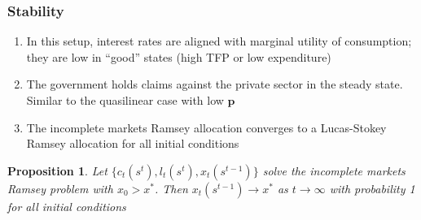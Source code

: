 \documentclass{beamer}
\newcommand{\EE}{\mathbb E}
\newtheorem{proposition}{Proposition}
\begin{document}
%
%
%
\begin{frame}
	\frametitle{Stability}
	\begin{enumerate}
	 \item In this setup, interest rates are aligned with marginal utility of consumption;  they are low  in ``good'' states (high TFP or low expenditure)
	 \item The government holds claims against the private sector in the steady state. Similar to the quasilinear case with  low  $\bm{p}$	
	 \item The incomplete markets Ramsey allocation converges to a Lucas-Stokey  Ramsey allocation for all initial conditions	 	
	\end{enumerate}


	\begin{proposition}  Let $\{c_t(s^t), l_t(s^t), x_t(s^{t-1})\}$ solve the incomplete markets Ramsey problem with $x_0 > x^*$.  Then  $x_t(s^{t-1})\rightarrow x^*$ as $t\rightarrow \infty$ with probability 1 for all initial conditions
	
	\end{proposition}
	\end{frame}
	
\end{document}
